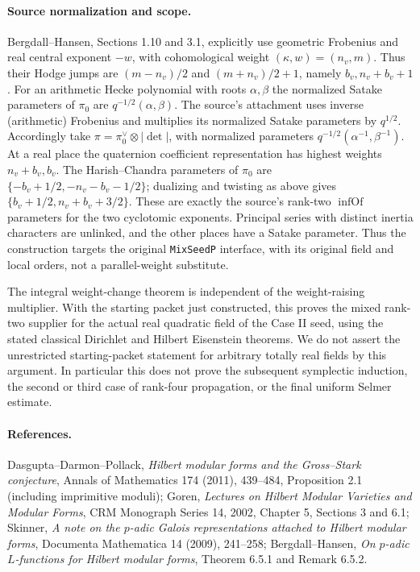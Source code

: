 \paragraph{Source normalization and scope.}
Bergdall--Hansen, Sections 1.10 and 3.1, explicitly use
geometric Frobenius and real central exponent \(-w\), with
cohomological weight \((\kappa,w)=(n_v,m)\).
Thus their Hodge jumps are \((m-n_v)/2\) and
\((m+n_v)/2+1\), namely \(b_v,n_v+b_v+1\).
For an arithmetic Hecke polynomial with roots \(\alpha,\beta\)
the normalized Satake parameters of \(\pi_0\) are
\(q^{-1/2}(\alpha,\beta)\). The source's attachment uses inverse
(arithmetic) Frobenius and multiplies its normalized Satake
parameters by \(q^{1/2}\). Accordingly take
\(\pi=\pi_0^\vee\otimes|\det|\), with normalized parameters
\(q^{-1/2}(\alpha^{-1},\beta^{-1})\).
At a real place the quaternion coefficient representation has
highest weights \(n_v+b_v,b_v\). The Harish--Chandra parameters
of \(\pi_0\) are
\(\{-b_v+1/2,-n_v-b_v-1/2\}\); dualizing and twisting as above
gives \(\{b_v+1/2,n_v+b_v+3/2\}\).
These are exactly the source's rank-two \(\operatorname{infOf}\)
parameters for the two cyclotomic exponents. Principal series
with distinct inertia characters are unlinked, and the other
places have a Satake parameter. Thus the construction targets
the original \texttt{MixSeedP} interface, with its original
field and local orders, not a parallel-weight substitute.

The integral weight-change theorem is independent of the
weight-raising multiplier. With the starting packet just constructed,
this proves the mixed rank-two supplier for the actual real quadratic
field of the Case II seed, using the stated classical Dirichlet and
Hilbert Eisenstein theorems. We do not assert the unrestricted
starting-packet statement for arbitrary totally real fields by
this argument. In particular this
does not prove the subsequent symplectic induction, the second
or third case of rank-four propagation, or the final uniform
Selmer estimate.

\paragraph{References.}
Dasgupta--Darmon--Pollack, \emph{Hilbert modular forms and the
Gross--Stark conjecture}, Annals of Mathematics 174 (2011),
439--484, Proposition 2.1 (including imprimitive moduli);
Goren, \emph{Lectures on Hilbert Modular Varieties and Modular
Forms}, CRM Monograph Series 14, 2002, Chapter 5,
Sections 3 and 6.1;
Skinner, \emph{A note on the \(p\)-adic Galois representations
attached to Hilbert modular forms}, Documenta Mathematica 14
(2009), 241--258;
Bergdall--Hansen, \emph{On \(p\)-adic \(L\)-functions for Hilbert
modular forms}, Theorem 6.5.1 and Remark 6.5.2.
